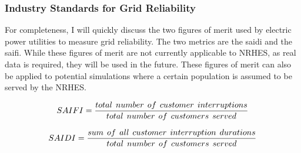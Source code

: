 \documentclass[12pt]{UIdahoMastersThesis}
\begin{document}
\subsubsection{Industry Standards for Grid Reliability}
For completeness, I will quickly discuss the two figures of merit used by electric power utilities to measure grid reliability.  The two metrics are the \ac{saidi} and the \ac{saifi}. While these figures of merit are not currently applicable to NRHES, as real data is required, they will be used in the future.  These figures of merit can also be applied to potential simulations where a certain population is assumed to be served by the NRHES.

\begin{equation*}
SAIFI =\frac{total\hspace{.15 cm} number\hspace{.15 cm} of\hspace{.15 cm} customer\hspace{.15 cm} interruptions}{total\hspace{.15 cm} number\hspace{.15 cm} of\hspace{.15 cm} customers\hspace{.15 cm} served}
\end{equation*}

\begin{equation*}
SAIDI = \frac{sum \hspace{.15 cm} of \hspace{.15 cm}all \hspace{.15 cm}customer\hspace{.15 cm}interruption \hspace{.15 cm} durations}{total\hspace{.15 cm}number\hspace{.15 cm}of\hspace{.15 cm}customers\hspace{.15 cm}served}
\end{equation*}
\end{document}

